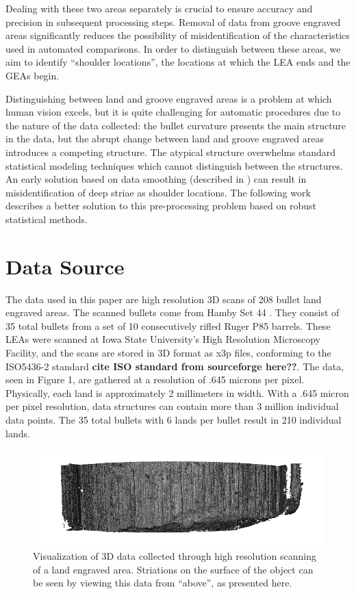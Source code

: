 \documentclass[12pt]{article}
\begin{document}
Dealing with these two areas separately is crucial to ensure accuracy
and precision in subsequent processing steps. Removal of data from
groove engraved areas significantly reduces the possibility of
misidentification of the characteristics used in automated comparisons.
In order to distinguish between these areas, we aim to identify
``shoulder locations'', the locations at which the LEA ends and the GEAs
begin.

Distinguishing between land and groove engraved areas is a problem at
which human vision excels, but it is quite challenging for automatic
procedures due to the nature of the data collected: the bullet curvature
presents the main structure in the data, but the abrupt change between
land and groove engraved areas introduces a competing structure. The
atypical structure overwhelms standard statistical modeling techniques
which cannot distinguish between the structures. An early solution based
on data smoothing (described in \citep{Hare1}) can result in
misidentification of deep striae as shoulder locations. The following
work describes a better solution to this pre-processing problem based on
robust statistical methods.

\section{Data Source}

The data used in this paper are high resolution 3D scans of 208 bullet
land engraved areas. The scanned bullets come from Hamby Set 44
\citep{Hamby}. They consist of 35 total bullets from a set of 10
consecutively rifled Ruger P85 barrels. These LEAs were scanned at Iowa
State University's High Resolution Microscopy Facility, and the scans
are stored in 3D format as x3p files, conforming to the ISO5436-2
standard \textbf{cite ISO standard from sourceforge here??}. The data,
seen in Figure 1, are gathered at a resolution of .645 microns per
pixel. Physically, each land is approximately 2 millimeters in width.
With a .645 micron per pixel resolution, data structures can contain
more than 3 million individual data points. The 35 total bullets with 6
lands per bullet result in 210 individual lands.

\begin{figure}
\centering
\includegraphics[width=6.25000in]{./images/3d_plot_top.png}
\caption{Visualization of 3D data collected through high resolution
scanning of a land engraved area. Striations on the surface of the
object can be seen by viewing this data from ``above'', as presented
here.}
\end{figure}
\end{document}
